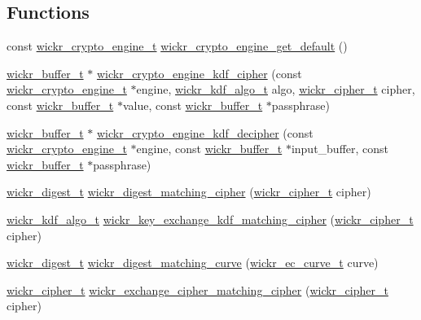 \subsection*{Functions}
\begin{DoxyCompactItemize}
\item 
const \mbox{\hyperlink{structwickr__crypto__engine}{wickr\+\_\+crypto\+\_\+engine\+\_\+t}} \mbox{\hyperlink{group__wickr__crypto__engine_ga74d5cea6c7d1d6e67b1be476fbaf6235}{wickr\+\_\+crypto\+\_\+engine\+\_\+get\+\_\+default}} ()
\item 
\mbox{\hyperlink{structwickr__buffer}{wickr\+\_\+buffer\+\_\+t}} $\ast$ \mbox{\hyperlink{group__wickr__crypto__engine_ga5709d94cd09ef0fb47d1a5f59232f115}{wickr\+\_\+crypto\+\_\+engine\+\_\+kdf\+\_\+cipher}} (const \mbox{\hyperlink{structwickr__crypto__engine}{wickr\+\_\+crypto\+\_\+engine\+\_\+t}} $\ast$engine, \mbox{\hyperlink{structwickr__kdf__algo}{wickr\+\_\+kdf\+\_\+algo\+\_\+t}} algo, \mbox{\hyperlink{structwickr__cipher}{wickr\+\_\+cipher\+\_\+t}} cipher, const \mbox{\hyperlink{structwickr__buffer}{wickr\+\_\+buffer\+\_\+t}} $\ast$value, const \mbox{\hyperlink{structwickr__buffer}{wickr\+\_\+buffer\+\_\+t}} $\ast$passphrase)
\item 
\mbox{\hyperlink{structwickr__buffer}{wickr\+\_\+buffer\+\_\+t}} $\ast$ \mbox{\hyperlink{group__wickr__crypto__engine_gab60480270e80ba34aa44385633037983}{wickr\+\_\+crypto\+\_\+engine\+\_\+kdf\+\_\+decipher}} (const \mbox{\hyperlink{structwickr__crypto__engine}{wickr\+\_\+crypto\+\_\+engine\+\_\+t}} $\ast$engine, const \mbox{\hyperlink{structwickr__buffer}{wickr\+\_\+buffer\+\_\+t}} $\ast$input\+\_\+buffer, const \mbox{\hyperlink{structwickr__buffer}{wickr\+\_\+buffer\+\_\+t}} $\ast$passphrase)
\item 
\mbox{\hyperlink{structwickr__digest}{wickr\+\_\+digest\+\_\+t}} \mbox{\hyperlink{group__wickr__crypto__engine_ga18c21501a41c97f2ba79a9366343cdcf}{wickr\+\_\+digest\+\_\+matching\+\_\+cipher}} (\mbox{\hyperlink{structwickr__cipher}{wickr\+\_\+cipher\+\_\+t}} cipher)
\item 
\mbox{\hyperlink{structwickr__kdf__algo}{wickr\+\_\+kdf\+\_\+algo\+\_\+t}} \mbox{\hyperlink{group__wickr__crypto__engine_ga6cdd263ddccd0b28a85ed61889805e60}{wickr\+\_\+key\+\_\+exchange\+\_\+kdf\+\_\+matching\+\_\+cipher}} (\mbox{\hyperlink{structwickr__cipher}{wickr\+\_\+cipher\+\_\+t}} cipher)
\item 
\mbox{\hyperlink{structwickr__digest}{wickr\+\_\+digest\+\_\+t}} \mbox{\hyperlink{group__wickr__crypto__engine_ga0a708e5e46c40eae5eaeb581f6a1aed2}{wickr\+\_\+digest\+\_\+matching\+\_\+curve}} (\mbox{\hyperlink{structwickr__ec__curve}{wickr\+\_\+ec\+\_\+curve\+\_\+t}} curve)
\item 
\mbox{\hyperlink{structwickr__cipher}{wickr\+\_\+cipher\+\_\+t}} \mbox{\hyperlink{group__wickr__crypto__engine_gaf44e3be9066727bf83034d3593dc74e2}{wickr\+\_\+exchange\+\_\+cipher\+\_\+matching\+\_\+cipher}} (\mbox{\hyperlink{structwickr__cipher}{wickr\+\_\+cipher\+\_\+t}} cipher)
\end{DoxyCompactItemize}
